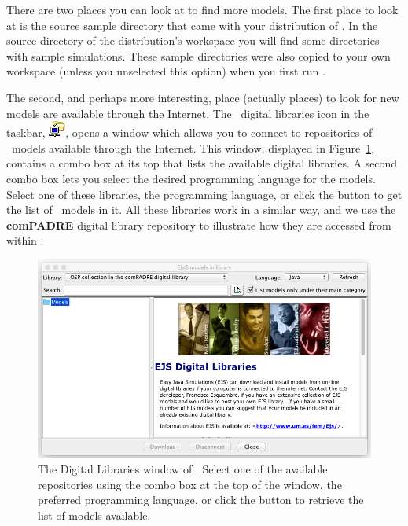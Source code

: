 There are two places you can look at to find more models.
The first place to look at is the source sample directory that came with your distribution of \ejs. In the source directory of the distribution's workspace you will find some directories with sample simulations. These sample directories were also copied to your own workspace (unless you unselected this option) when you first run \ejs.

The second, and perhaps more interesting, place (actually places) to look for new models are available through the Internet. The \ejs\ digital libraries icon in the taskbar, \includegraphics[scale=\linescale]{../_common/icons_png/netOpen.png}, opens a window which allows you to connect to repositories of \ejs\ models available through the Internet. This window, displayed in Figure~\ref{fig:01Introduction/EJSDigitalLibraries}, contains a combo box at its top that lists the available digital libraries. A second combo box lets you select the desired programming language for the models.  Select one of these libraries, the programming language, or click the  button to get the list of \ejs\ models in it. All these libraries work in a similar way, and we use the \textbf{comPADRE} digital library repository to illustrate how they are accessed from within \ejs.

\begin{figure}[htb]
    \centering
  \includegraphics[scale=\scale]{01Introduction/images/EJSDigitalLibraries.png}
    \caption{The Digital Libraries window of \ejs. Select one of the available repositories using the combo box at the top of the window, the preferred programming language, or click the  button to retrieve the list of models available.}
    \label{fig:01Introduction/EJSDigitalLibraries}
\end{figure}

